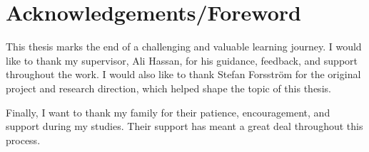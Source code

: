 

\section*{Acknowledgements/Foreword}

This thesis marks the end of a challenging and valuable learning journey. I would like to thank my supervisor, Ali Hassan, for his guidance, feedback, and support throughout the work. I would also like to thank Stefan Forsström for the original project and research direction, which helped shape the topic of this thesis.

Finally, I want to thank my family for their patience, encouragement, and support during my studies. Their support has meant a great deal throughout this process.